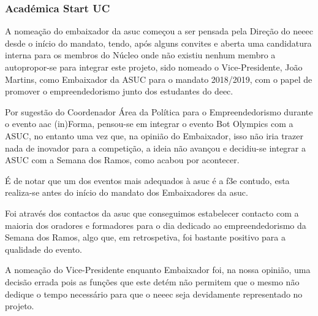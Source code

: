 
\subsubsection{Académica Start UC}

A nomeação do embaixador da \acrfull{asuc} começou a ser pensada pela Direção do \acrshort{neeec} desde o início do mandato, tendo, após alguns convites e aberta uma candidatura interna para os membros do Núcleo onde não existiu nenhum membro a autopropor-se para integrar este projeto, sido nomeado o Vice-Presidente, João Martins, como Embaixador da ASUC para o mandato 2018/2019, com o papel de promover o empreendedorismo junto dos estudantes do \acrshort{deec}.

Por sugestão do Coordenador Área da Política para o Empreendedorismo durante o evento \acrshort{aac} (in)Forma, pensou-se em integrar o evento Bot Olympics com a ASUC, no entanto uma vez que, na opinião do Embaixador, isso não iria trazer nada de inovador para a competição, a ideia não avançou e decidiu-se integrar a ASUC com a Semana dos Ramos, como acabou por acontecer.

É de notar que um dos eventos mais adequados à \acrshort{asuc} é a \acrshort{f3e} contudo, esta realiza-se antes do início do mandato dos Embaixadores da \acrshort{asuc}.

Foi através dos contactos da \acrshort{asuc} que conseguimos estabelecer contacto com a maioria dos oradores e formadores para o dia dedicado ao empreendedorismo da Semana dos Ramos, algo que, em retrospetiva, foi bastante positivo para a qualidade do evento.

A nomeação do Vice-Presidente enquanto Embaixador foi, na nossa opinião, uma decisão errada pois as funções que este detém não permitem que o mesmo não dedique o tempo necessário para que o \acrshort{neeec} seja devidamente representado no projeto.
